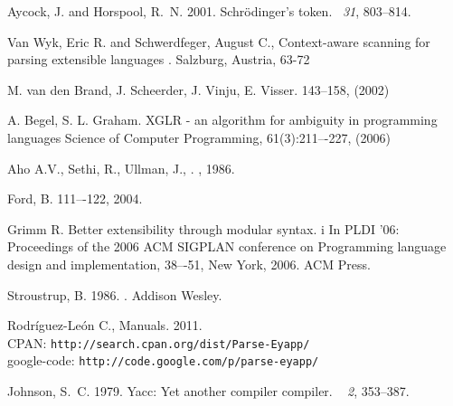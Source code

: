 
{\sc Aycock, J.} {\sc and} {\sc Horspool, R.~N.} 2001.
\newblock Schr\"{o}dinger's token.
~{\em 31}, 803--814.

{\sc Van Wyk, Eric R. and Schwerdfeger, August C.},
\newblock Context-aware scanning for parsing extensible languages
. Salzburg, Austria, 63-72  

{\sc M. van den Brand, J. Scheerder, J. Vinju, E. Visser.}
 143--158, (2002)

{\sc A. Begel, S. L. Graham.} 
\newblock XGLR - an algorithm for ambiguity in programming languages
\newblock Science of Computer Programming, 61(3):211–-227, (2006)

{\sc Aho A.V., Sethi, R., Ullman, J.},
.
, 1986.

{\sc Ford, B.}
 111–-122, 2004.

{\sc Grimm R.}
\newblock Better extensibility through modular syntax. i
\newblock In PLDI ’06: Proceedings of the 2006 ACM SIGPLAN conference on Programming language design and implementation, 38–-51, New York, 2006. ACM Press.

{\sc Stroustrup, B.} 1986.
.
\newblock Addison Wesley.

{\sc Rodr\'iguez-Le\'on C.},
 Manuals. 2011.
\newblock \\CPAN: {\tt http://search.cpan.org/dist/Parse-Eyapp/ } 
\newblock \\google-code: {\tt http://code.google.com/p/parse-eyapp/ } 

{\sc Johnson, S.~C.} 1979.
\newblock Yacc: Yet another compiler compiler.
~{\em
  2}, 353--387.

